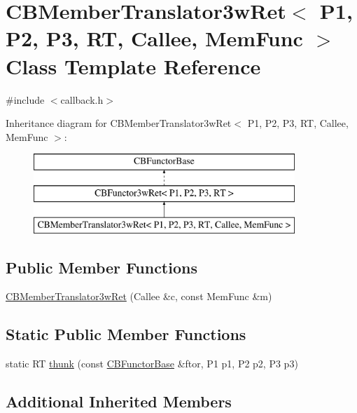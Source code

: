\hypertarget{class_c_b_member_translator3w_ret}{\section{C\+B\+Member\+Translator3w\+Ret$<$ P1, P2, P3, R\+T, Callee, Mem\+Func $>$ Class Template Reference}
\label{class_c_b_member_translator3w_ret}
}


{\ttfamily \#include $<$callback.\+h$>$}

Inheritance diagram for C\+B\+Member\+Translator3w\+Ret$<$ P1, P2, P3, R\+T, Callee, Mem\+Func $>$\+:\begin{figure}[H]
\begin{center}
\leavevmode
\includegraphics[height=3.000000cm]{class_c_b_member_translator3w_ret}
\end{center}
\end{figure}
\subsection*{Public Member Functions}
\begin{DoxyCompactItemize}
\item 
\hyperlink{class_c_b_member_translator3w_ret_a71e2bbd6db9020a6b541a650ff7d81d5}{C\+B\+Member\+Translator3w\+Ret} (Callee \&c, const Mem\+Func \&m)
\end{DoxyCompactItemize}
\subsection*{Static Public Member Functions}
\begin{DoxyCompactItemize}
\item 
static R\+T \hyperlink{class_c_b_member_translator3w_ret_a87eed002836701d52bf8f243c6fcc338}{thunk} (const \hyperlink{class_c_b_functor_base}{C\+B\+Functor\+Base} \&ftor, P1 p1, P2 p2, P3 p3)
\end{DoxyCompactItemize}
\subsection*{Additional Inherited Members}


